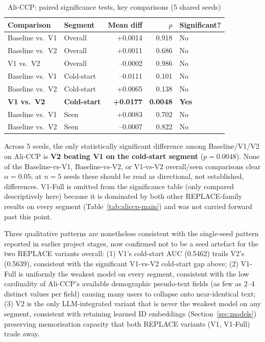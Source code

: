 \begin{table}[h]
\centering
\caption{Ali-CCP: paired significance tests, key comparisons (5 shared seeds)}
\label{tab:aliccp-sig}
\begin{tabular}{llrrl}
\toprule
Comparison & Segment & Mean diff & $p$ & Significant? \\
\midrule
Baseline vs.\ V1 & Overall & +0.0014 & 0.918 & No \\
Baseline vs.\ V2 & Overall & +0.0011 & 0.686 & No \\
V1 vs.\ V2       & Overall & --0.0002 & 0.986 & No \\
Baseline vs.\ V1 & Cold-start & --0.0111 & 0.101 & No \\
Baseline vs.\ V2 & Cold-start & +0.0065 & 0.138 & No \\
\textbf{V1 vs.\ V2} & \textbf{Cold-start} & \textbf{+0.0177} & \textbf{0.0048} & \textbf{Yes} \\
Baseline vs.\ V1 & Seen & +0.0083 & 0.702 & No \\
Baseline vs.\ V2 & Seen & --0.0007 & 0.822 & No \\
\bottomrule
\end{tabular}
\end{table}

Across 5 seeds, the only statistically significant difference among Baseline/V1/V2 on Ali-CCP is \textbf{V2 beating V1 on the cold-start segment} ($p=0.0048$). None of the Baseline-vs-V1, Baseline-vs-V2, or V1-vs-V2 overall/seen comparisons clear $\alpha=0.05$; at $n=5$ seeds these should be read as directional, not established, differences. V1-Full is omitted from the significance table (only compared descriptively here) because it is dominated by both other REPLACE-family results on every segment (Table~\ref{tab:aliccp-main}) and was not carried forward past this point.

Three qualitative patterns are nonetheless consistent with the single-seed pattern reported in earlier project stages, now confirmed not to be a seed artefact for the two REPLACE variants overall: (1) V1's cold-start AUC (0.5462) trails V2's (0.5639), consistent with the significant V1-vs-V2 cold-start gap above; (2) V1-Full is uniformly the weakest model on every segment, consistent with the low cardinality of Ali-CCP's available demographic pseudo-text fields (as few as 2--4 distinct values per field) causing many users to collapse onto near-identical text; (3) V2 is the only LLM-integrated variant that is never the weakest model on any segment, consistent with retaining learned ID embeddings (Section~\ref{sec:models}) preserving memorisation capacity that both REPLACE variants (V1, V1-Full) trade away.

